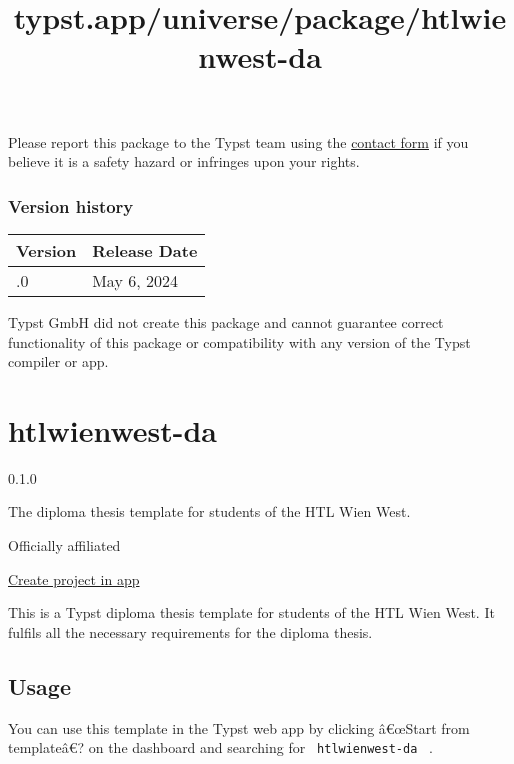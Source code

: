 Please report this package to the Typst team using the
\href{https://typst.app/contact}{contact form} if you believe it is a
safety hazard or infringes upon your rights.

\label{versions}
\subsubsection{Version history}\label{version-history}

\begin{longtable}[]{@{}ll@{}}
\toprule\noalign{}
Version & Release Date \\
\midrule\noalign{}
\endhead
\bottomrule\noalign{}
\endlastfoot
0.1.0 & May 6, 2024 \\
\end{longtable}

Typst GmbH did not create this package and cannot guarantee correct
functionality of this package or compatibility with any version of the
Typst compiler or app.


\title{typst.app/universe/package/htlwienwest-da}

\label{banner}
\label{template-thumbnail}

\section{htlwienwest-da}\label{htlwienwest-da}

{ 0.1.0 }

The diploma thesis template for students of the HTL Wien West.

{ } Officially affiliated

\href{/app?template=htlwienwest-da&version=0.1.0}{Create project in app}

\label{readme}
This is a Typst diploma thesis template for students of the HTL Wien
West. It fulfils all the necessary requirements for the diploma thesis.

\subsection{Usage}\label{usage}

You can use this template in the Typst web app by clicking â€œStart from
templateâ€? on the dashboard and searching for
\texttt{\ htlwienwest-da\ } .

